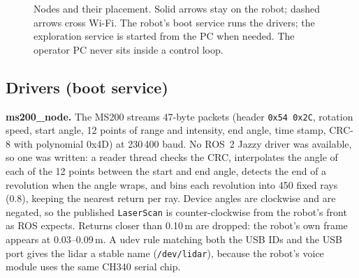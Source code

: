 \documentclass[10pt,twocolumn]{article}
\begin{document}
\begin{figure}[t]
\caption{Nodes and their placement. Solid arrows stay on the robot; dashed arrows cross Wi-Fi.
The robot's boot service runs the drivers; the exploration service is started from the PC when
needed. The operator PC never sits inside a control loop.}
\label{fig:architecture}
\end{figure}

\subsection{Drivers (boot service)}
\textbf{ms200\_node.} The MS200 streams 47-byte packets (header \texttt{0x54 0x2C}, rotation
speed, start angle, 12 points of range and intensity, end angle, time stamp, CRC-8 with polynomial
0x4D) at 230\,400 baud. No ROS~2 Jazzy driver was available, so one was written: a reader thread
checks the CRC, interpolates the angle of each of the 12 points between the start and end angle,
detects the end of a revolution when the angle wraps, and bins each revolution into 450 fixed
rays (0.8\textdegree), keeping the nearest return per ray. Device angles are clockwise and are
negated, so the published \texttt{LaserScan} is counter-clockwise from the robot's front as ROS
expects. Returns closer than 0.10\,m are dropped: the robot's own frame appears at 0.03--0.09\,m.
A udev rule matching both the USB IDs and the USB port gives the lidar a stable name
(\texttt{/dev/lidar}), because the robot's voice module uses the same CH340 serial chip.
\end{document}
